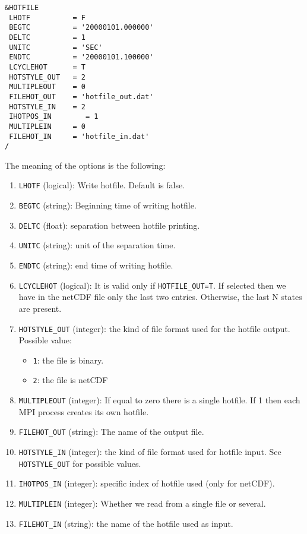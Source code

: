 \documentclass[12pt]{amsart}
\begin{document}
\begin{verbatim}
&HOTFILE
 LHOTF          = F
 BEGTC          = '20000101.000000' 
 DELTC          = 1     
 UNITC          = 'SEC' 
 ENDTC          = '20000101.100000' 
 LCYCLEHOT      = T
 HOTSTYLE_OUT   = 2
 MULTIPLEOUT    = 0
 FILEHOT_OUT    = 'hotfile_out.dat' 
 HOTSTYLE_IN    = 2 
 IHOTPOS_IN        = 1
 MULTIPLEIN     = 0 
 FILEHOT_IN     = 'hotfile_in.dat'
/
\end{verbatim}
The meaning of the options is the following:
\begin{enumerate}
\item {\tt LHOTF} (logical): Write hotfile. Default is false.
\item {\tt BEGTC} (string): Beginning time of writing hotfile.
\item {\tt DELTC} (float): separation between hotfile printing.
\item {\tt UNITC} (string): unit of the separation time.
\item {\tt ENDTC} (string): end time of writing hotfile.
\item {\tt LCYCLEHOT} (logical): It is valid only if {\tt HOTFILE\_OUT=T}. If selected then we have in the netCDF file only the last two entries. Otherwise, the last N states are present.
\item {\tt HOTSTYLE\_OUT} (integer): the kind of file format used for the hotfile output. Possible value:
  \begin{itemize}
  \item {\tt 1}: the file is binary.
  \item {\tt 2}: the file is netCDF
  \end{itemize}
\item {\tt MULTIPLEOUT} (integer): If equal to zero there is a single hotfile. If 1 then each MPI process creates its own hotfile.
\item {\tt FILEHOT\_OUT} (string): The name of the output file.
\item {\tt HOTSTYLE\_IN} (integer): the kind of file format used for hotfile input. See {\tt HOTSTYLE\_OUT} for possible values.
\item {\tt IHOTPOS\_IN} (integer): specific index of hotfile used (only for netCDF).
\item {\tt MULTIPLEIN} (integer): Whether we read from a single file or several.
\item {\tt FILEHOT\_IN} (string): the name of the hotfile used as input.
\end{enumerate}
\end{document}
